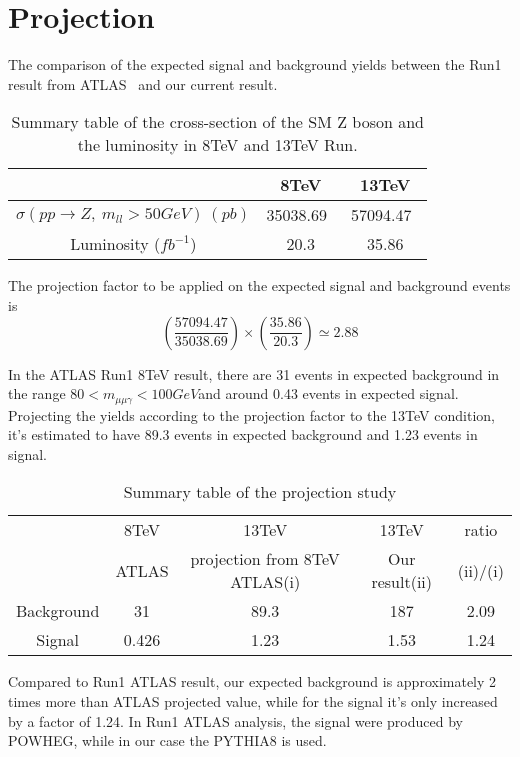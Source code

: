 \chapter{Projection}
\label{sec:Appendix_proj}
The comparison of the expected signal and background yields between the Run1 result from ATLAS~\cite{Aad:2015sda} and our current result.
\begin{table}[h]
  \begin{center}                                                                                                                                    
    \caption{Summary table of the cross-section of the SM Z boson and the luminosity in 8TeV and 13TeV Run.}
    \begin{tabular}{c|c|c}
      & 8TeV & 13TeV \\
      \hline
      $\sigma(pp\to Z,\ m_{ll}>50 GeV)\ (pb)$ & 35038.69~\cite{SM_CrossSection8TeV}  & 57094.47~\cite{SM_CrossSection} \\
      Luminosity ($fb^{-1}$) & 20.3 & 35.86\\
    \end{tabular}                                                                                                                                  
    \label{tab:params}                                                                                                                            
  \end{center}
\end{table} 

The projection factor to be applied on the expected signal and background events is 
\begin{equation}
(\frac{57094.47}{35038.69})\times(\frac{35.86}{20.3})\simeq 2.88
\label{eqn:proj_factor}
\end{equation}

In the ATLAS Run1 8TeV result, there are 31 events in expected background in the range $80<m_{\mu\mu\gamma}<100 GeV$and around 0.43 events in expected signal. Projecting the yields according to the projection factor to the 13TeV condition, it's estimated to have 89.3 events in expected background and 1.23 events in signal.  

\begin{table}[h]
  \begin{center}
    \caption{Summary table of the projection study}
    \begin{tabular}{c|c|c|c|c}
      & 8TeV & 13TeV & 13TeV & ratio\\
      & ATLAS & projection from 8TeV ATLAS(i) & Our result(ii) & (ii)/(i)\\
      \hline
      \hline
      Background & 31 & 89.3 & 187 & 2.09\\
      Signal & 0.426 & 1.23 & 1.53 & 1.24\\
    \end{tabular}
    \label{tab:proj}
  \end{center}
\end{table}

Compared to Run1 ATLAS result, our expected background is approximately 2 times more than ATLAS projected value, while for the signal it's only increased by a factor of 1.24. In Run1 ATLAS analysis, the signal were produced by POWHEG, while in our case the PYTHIA8 is used.
